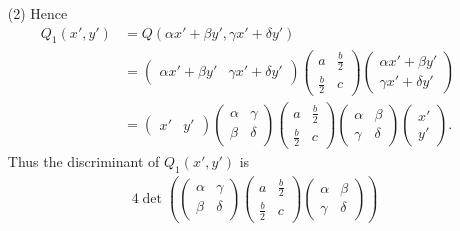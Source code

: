 \documentclass{article}
\begin{document}
\begin{enumerate}
\item[(2)]
  Hence
  \begin{align*}
    Q_1(x',y')
    &= Q(\alpha x' + \beta y', \gamma x' + \delta y') \\
    &=
    \begin{pmatrix}
      \alpha x' + \beta y' & \gamma x' + \delta y'
    \end{pmatrix}
    \begin{pmatrix}
      a & \frac{b}{2} \\
      \frac{b}{2} & c
    \end{pmatrix}
    \begin{pmatrix}
      \alpha x' + \beta y' \\
      \gamma x' + \delta y'
    \end{pmatrix} \\
    &=
    \begin{pmatrix}
      x' & y'
    \end{pmatrix}
    \begin{pmatrix}
      \alpha & \gamma \\
      \beta & \delta
    \end{pmatrix}
    \begin{pmatrix}
      a & \frac{b}{2} \\
      \frac{b}{2} & c
    \end{pmatrix}
    \begin{pmatrix}
      \alpha & \beta \\
      \gamma & \delta
    \end{pmatrix}
    \begin{pmatrix}
      x' \\
      y'
    \end{pmatrix}.
  \end{align*}
  Thus the discriminant of $Q_1(x',y')$ is
  \begin{align*}
    & \:
    4 \det\left(
    \begin{pmatrix}
      \alpha & \gamma \\
      \beta & \delta
    \end{pmatrix}
    \begin{pmatrix}
      a & \frac{b}{2} \\
      \frac{b}{2} & c
    \end{pmatrix}
    \begin{pmatrix}
      \alpha & \beta \\
      \gamma & \delta
    \end{pmatrix}
    \right) \\

\end{align*}
\end{enumerate}
\end{document}
